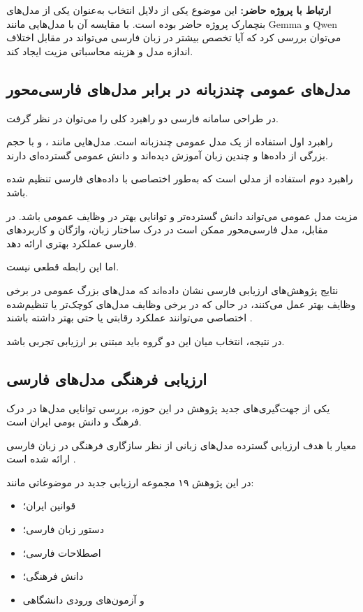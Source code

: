 \textbf{ارتباط با پروژه حاضر:}
این موضوع یکی از دلایل انتخاب  به‌عنوان یکی از مدل‌های
بنچمارک پروژه حاضر بوده است.
با مقایسه آن با مدل‌هایی مانند Gemma و Qwen می‌توان بررسی کرد
که آیا تخصص بیشتر در زبان فارسی می‌تواند در مقابل اختلاف
اندازه مدل و هزینه محاسباتی مزیت ایجاد کند.


\subsection{مدل‌های عمومی چندزبانه در برابر مدل‌های فارسی‌محور}

در طراحی سامانه فارسی دو راهبرد کلی را می‌توان در نظر گرفت.

راهبرد اول استفاده از یک مدل عمومی چندزبانه است.
مدل‌هایی مانند
،
و
با حجم بزرگی از داده‌ها و چندین زبان آموزش دیده‌اند و دانش
عمومی گسترده‌ای دارند.

راهبرد دوم استفاده از مدلی است که به‌طور اختصاصی با داده‌های
فارسی تنظیم شده باشد.

مزیت مدل عمومی می‌تواند دانش گسترده‌تر و توانایی بهتر در
وظایف عمومی باشد.
در مقابل، مدل فارسی‌محور ممکن است در درک ساختار زبان،
واژگان و کاربردهای فارسی عملکرد بهتری ارائه دهد.

اما این رابطه قطعی نیست.

نتایج پژوهش‌های ارزیابی فارسی نشان داده‌اند که مدل‌های بزرگ
عمومی در برخی وظایف بهتر عمل می‌کنند، در حالی که در برخی
وظایف مدل‌های کوچک‌تر یا تنظیم‌شده اختصاصی می‌توانند عملکرد
رقابتی یا حتی بهتر داشته باشند
\cite{abaskohi2024persianllm}.

در نتیجه، انتخاب میان این دو گروه باید مبتنی بر ارزیابی
تجربی باشد.


\subsection{ارزیابی فرهنگی مدل‌های فارسی}

یکی از جهت‌گیری‌های جدید پژوهش در این حوزه، بررسی توانایی
مدل‌ها در درک فرهنگ و دانش بومی ایران است.

معیار
با هدف ارزیابی گسترده مدل‌های زبانی از نظر سازگاری فرهنگی
در زبان فارسی ارائه شده است
\cite{farsi2025melac}.

در این پژوهش ۱۹ مجموعه ارزیابی جدید در موضوعاتی مانند:

\begin{itemize}

    \item قوانین ایران؛
    \item دستور زبان فارسی؛
    \item اصطلاحات فارسی؛
    \item دانش فرهنگی؛
    \item و آزمون‌های ورودی دانشگاهی
\end{itemize}

